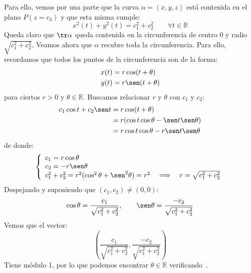 \begin{ejercicio}
    \noindent
    Para ello, vemos por una parte que la curva $\alpha=(x,y,z)$ está contenida en el plano $P(z=c_3)$ y que esta misma cumple:
    \begin{equation*}
        x^2(t) + y^2(t) = c_1^2 + c_2^2 \qquad \forall t\in \mathbb{R}
    \end{equation*}
    Queda claro que $\tr \alpha$ queda contenida en la circunferencia de centro $0$ y radio $\sqrt{c_1^2+c_2^2}$. Veamos ahora que $\alpha$ recubre toda la circunferencia. Para ello, recordamos que todos los puntos de la circunferencia son de la forma:
    \begin{align*}
        x(t) &= r\cos(t+\theta) \\
        y(t) &= r\sen(t+\theta)
    \end{align*}
    para ciertos $r>0$ y $\theta\in \mathbb{R}$. Buscamos relacionar $r$ y $\theta$ con $c_1$ y $c_2$:
    \begin{align*}
        c_1\cos t + c_2 \sen t &= r\cos(t+\theta) \\
                               &= r(\cos t\cos\theta - \sen t\sen \theta) \\
                               &= r\cos t\cos\theta - r\sen t\sen\theta
    \end{align*}
    de donde:
    \begin{equation*}
        \left\{\begin{array}{l}
            c_1 = r\cos\theta \\
            c_2 = -r\sen\theta \\
            c_1^2 + c_2^2 = r^2(\cos^2\theta + \sen^2\theta) = r^2 \quad\Longrightarrow\quad r = \sqrt{c_1^2 + c_2^2}
        \end{array}\right. 
    \end{equation*}
    Despejando y suponiendo que $(c_1,c_2)\neq (0,0)$:
    \begin{equation}\label{eq:ej1}
       \cos\theta = \frac{c_1}{\sqrt{c_1^2+c_2^2}} , \qquad \sen\theta = \frac{-c_2}{\sqrt{c_1^2+c_2^2}}
    \end{equation}
    Vemos que el vector:
    \begin{equation*}
        \left(\frac{c_1}{\sqrt{c_1^2+c_2^2}}, \frac{-c_2}{\sqrt{c_1^2+c_2^2}}\right)
    \end{equation*}
    Tiene módulo 1, por lo que podemos encontrar $\theta\in \mathbb{R}$ verificando~.\\


\end{ejercicio}
